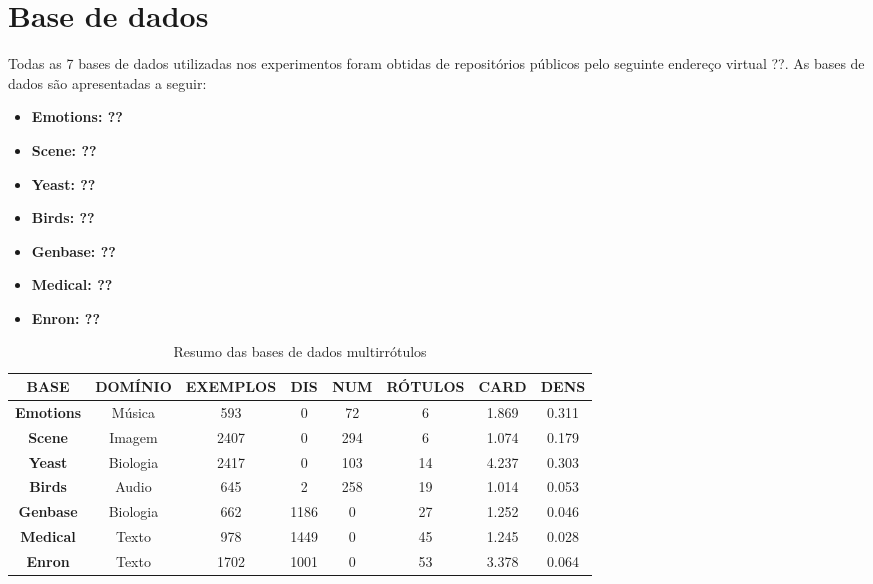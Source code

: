 \section{Base de dados}
Todas as 7 bases de dados utilizadas nos experimentos foram obtidas de repositórios públicos pelo seguinte endereço virtual ??.
As bases de dados são apresentadas a seguir:

\begin{itemize}
\item \bf{Emotions}: ??
\item \bf{Scene}: ??
\item \bf{Yeast}: ??
\item \bf{Birds}: ??
\item \bf{Genbase}: ??
\item \bf{Medical}: ??
\item \bf{Enron}: ??	

\end{itemize}
\label{tab:datas}
\begin{table}[h]
\caption{Resumo das bases de dados multirrótulos}
\begin{tabular}{|c|ccccccc|}
\hline
\textbf{BASE}     & \textbf{DOMÍNIO} & \textbf{EXEMPLOS} & \textbf{DIS} & \textbf{NUM} & \textbf{RÓTULOS} & \textbf{CARD} & \textbf{DENS} \\ \hline
\textbf{Emotions} & Música           & 593               & 0                 & 72                 & 6                & 1.869                  & 0.311              \\
\textbf{Scene}    & Imagem           & 2407              & 0                 & 294                & 6                & 1.074                  & 0.179              \\
\textbf{Yeast}    & Biologia         & 2417              & 0                 & 103                & 14               & 4.237                  & 0.303              \\
\textbf{Birds}    & Audio            & 645               & 2                 & 258                & 19               & 1.014                  & 0.053              \\
\textbf{Genbase}  & Biologia         & 662               & 1186              & 0                  & 27               & 1.252                  & 0.046              \\
\textbf{Medical}  & Texto            & 978               & 1449              & 0                  & 45               & 1.245                  & 0.028              \\
\textbf{Enron}    & Texto            & 1702              & 1001              & 0                  & 53               & 3.378                  & 0.064             \\ \hline
\end{tabular}
\end{table}

